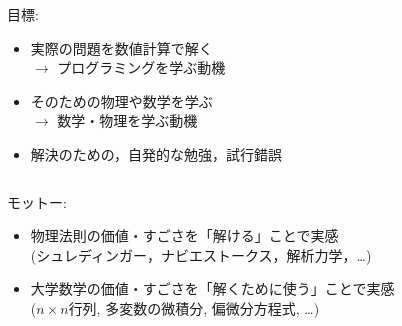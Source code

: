 \documentclass[10pt,dvipdfmx]{beamer}
\newcommand{\ao}[1]{{\color{blue}#1}}
\newcommand{\aka}[1]{{\color{red}#1}}
\begin{document}
\begin{frame}[fragile]
\begin{columns}
\begin{column}{0.53\textwidth}

目標:
\begin{itemize}
\item 実際の問題を数値計算で解く \\
$\rightarrow$ \ao{プログラミングを学ぶ動機}
\item そのための物理や数学を学ぶ \\
$\rightarrow$ \ao{数学・物理を学ぶ動機}
\item 解決のための，\aka{自発的な勉強，試行錯誤}
\end{itemize}
\end{column}
\end{columns}

モットー:
\begin{center}
\begin{itemize}
\item 物理法則の価値・すごさを「解ける」ことで実感 \\
  {\footnotesize (シュレディンガー，ナビエストークス，解析力学，\ldots)}
\item 大学数学の価値・すごさを「解くために使う」ことで実感 \\
  {\footnotesize ($n\times n$行列, 多変数の微積分, 偏微分方程式, \ldots)}
\end{itemize}
\end{center}

\end{frame}
\end{document}
